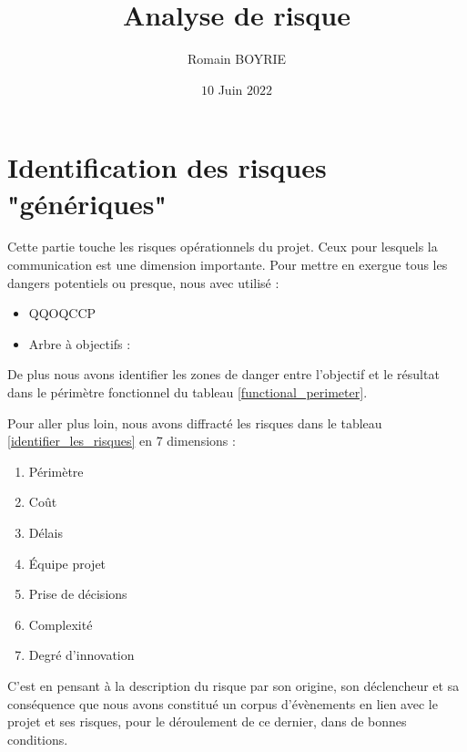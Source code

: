 \documentclass[12pt]{article}
\title{Analyse de risque}
\author{Romain BOYRIE}
\date{$10$ Juin $2022$}
\begin{document}
\maketitle

\setcounter{tocdepth}{2} 

\tableofcontents 

\listoffigures

\listoftables 

\newpage

\section{Identification des risques "génériques"}
Cette partie touche les risques opérationnels du projet. Ceux pour lesquels la communication est une dimension importante. Pour mettre en exergue tous les dangers potentiels ou presque, nous avec utilisé :
\begin{itemize}
	\item QQOQCCP
	\item Arbre à objectifs : 
\end{itemize}

De plus nous avons identifier les zones de danger entre l’objectif et le résultat dans le périmètre fonctionnel du tableau \ref{functional_perimeter}. 

Pour aller plus loin, nous avons diffracté les risques dans le tableau \ref{identifier_les_risques} en 7 dimensions :
\begin{enumerate}
	\item Périmètre
	\item Coût
	\item Délais
	\item Équipe projet
	\item Prise de décisions
	\item Complexité
	\item Degré d’innovation
\end{enumerate}

C’est en pensant à la description du risque par son origine, son déclencheur et sa conséquence que nous avons constitué un corpus d’évènements en lien avec le projet et ses risques, pour le déroulement de ce dernier, dans de bonnes conditions.
\end{document}
